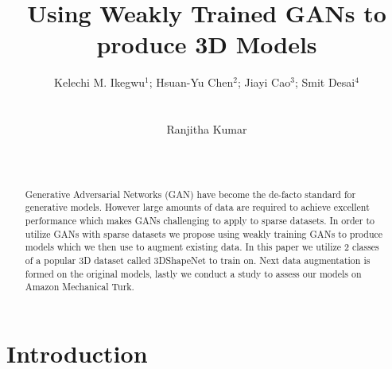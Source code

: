 \documentclass{sigchi}
\begin{document}
\title{Using Weakly Trained GANs to produce 3D Models}

\author{
  \alignauthor Kelechi M. Ikegwu\(^1\); Hsuan-Yu Chen\(^2\); Jiayi Cao\(^3\); Smit Desai\(^4\)\\
    \\
    \\
  \alignauthor Ranjitha Kumar\\
    \\
    \\
}

\maketitle

\begin{abstract}
Generative Adversarial Networks (GAN) have become the de-facto standard for generative models. However large amounts of data are required to achieve excellent performance which makes GANs challenging to apply to sparse datasets. In order to utilize GANs with sparse datasets we propose using weakly training GANs to produce models which we then use to augment existing data. In this paper we utilize 2 classes of a popular 3D dataset called 3DShapeNet to train on. Next data augmentation is formed on the original models, lastly we conduct a study to assess our models on Amazon Mechanical Turk.

\end{abstract}



\section{Introduction}
\end{document}
